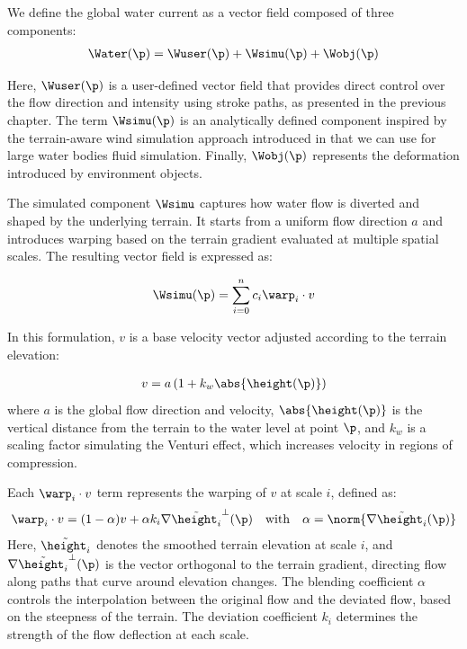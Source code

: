 We define the global water current as a vector field composed of three components:
\begin{align}
    \Water(\p) = \Wuser(\p) + \Wsimu(\p) + \Wobj(\p)
\end{align}

Here, $\Wuser(\p)$ is a user-defined vector field that provides direct control over the flow direction and intensity using stroke paths, as presented in the previous chapter. The term $\Wsimu(\p)$ is an analytically defined component inspired by the terrain-aware wind simulation approach introduced in \citep{Paris2019b} that we can use for large water bodies fluid simulation. Finally, $\Wobj(\p)$ represents the deformation introduced by environment objects.

The simulated component $\Wsimu$ captures how water flow is diverted and shaped by the underlying terrain. It starts from a uniform flow direction $a$ and introduces warping based on the terrain gradient evaluated at multiple spatial scales. The resulting vector field is expressed as:

\begin{align}
    \Wsimu(\p) = \sum_{i=0}^{n}{c_i \warp_i \cdot v}
\end{align}

In this formulation, $v$ is a base velocity vector adjusted according to the terrain elevation:

\begin{align}
    v = a \left(1 + k_w \abs{\height(\p)} \right)
\end{align}
where $a$ is the global flow direction and velocity, $\abs{\height(\p)}$ is the vertical distance from the terrain to the water level at point $\p$, and $k_w$ is a scaling factor simulating the Venturi effect, which increases velocity in regions of compression.

Each $\warp_i \cdot v$ term represents the warping of $v$ at scale $i$, defined as:
\begin{align}
    \warp_i \cdot v = (1 - \alpha) v + \alpha k_i \nabla \Tilde{\height_i}^{\perp}(\p) \quad \text{with} \quad \alpha = \norm{ \nabla \Tilde{\height_i}(\p) }
\end{align}
Here, $\Tilde{\height_i}$ denotes the smoothed terrain elevation at scale $i$, and $\nabla \Tilde{\height_i}^{\perp}(\p)$ is the vector orthogonal to the terrain gradient, directing flow along paths that curve around elevation changes. The blending coefficient $\alpha$ controls the interpolation between the original flow and the deviated flow, based on the steepness of the terrain. The deviation coefficient $k_i$ determines the strength of the flow deflection at each scale.


